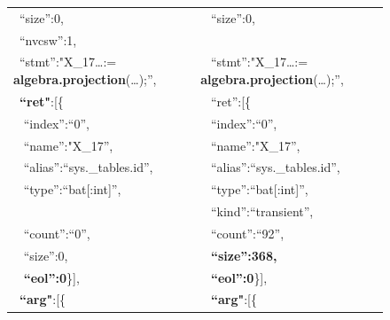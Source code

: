 \documentclass[conference]{IEEEtran}
\begin{document}
\begin{figure}[t]
{\begin{tabular}{|l@{~}l|}
 ~``size'':0,                                             &   ~ ``size'':0,                                              \\
 ~{\color{red}``nvcsw'':1,}                               &   ~                                                          \\
 ~``stmt'':"X\_17…:= \textbf{algebra.projection}(…);'',   &   ~ ``stmt'':"X\_17…:= \textbf{algebra.projection}(…);'',    \\
 ~\textbf{``ret"}:[\{                                     &   ~ ``ret'':[\{                                              \\
 ~   ``index'':``0'',                                     &   ~    ``index'':``0'',                                      \\
 ~   ``name'':"X\_17'',                                   &   ~    ``name'':"X\_17'',                                    \\
 ~   ``alias'':``sys.\_tables.id'',                       &   ~    ``alias'':``sys.\_tables.id'',                        \\
 ~   ``type'':``bat[:int]'',                              &   ~    ``type'':``bat[:int]'',                               \\
 ~                                                        &   ~ {\color{red}``kind'':``transient'',}                     \\
 ~   {\color{red}``count'':``0'',}                        &   ~    {\color{red}``count'':``92'',}                        \\
 ~   {\color{red}``size'':0,}                             &   ~    \textbf{\color{red}``size'':368,}                     \\
 ~   \textbf{``eol'':0}\}],                               &   ~    \textbf{``eol'':0}\}],                                \\
 ~\textbf{``arg"}:[\{                                     &   ~ \textbf{``arg"}:[\{                                      \\

\end{tabular}}
\end{figure}
\end{document}
